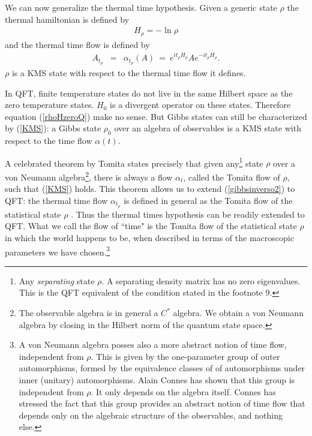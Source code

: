 \documentclass[10pt,nofootinbib]{revtex4}
\begin{document}
We can now generalize the thermal time hypothesis.  Given a generic
state $\rho$ the thermal hamiltonian is defined by
\begin{eqnarray}
H_{\rho} = -\ln \rho
\label{Htr}
\end{eqnarray}
and the thermal time flow is defined by 
\begin{eqnarray}
A_{t_{\rho}}& = & \alpha_{t_{\rho}}(A) \ =\ e^{it_{\rho} H_{\rho}}A
e^{-it_{\rho} H_{\rho}}.
\label{ABtQM} 
\end{eqnarray}
$\rho$ is a KMS state with respect to the thermal time flow  it defines.

In QFT, finite
temperature states do not live in the same Hilbert space as the zero
temperature states.  $H_{0}$ is a divergent operator on these states. 
Therefore equation (\ref{rhoHzeroQ}) make no sense.
But Gibbs states can still be characterized by (\ref{KMS}): a Gibbs state
$\rho_{0}$ over an algebra of observables is a KMS state with respect
to the time flow $\alpha(t)$.

A celebrated theorem by Tomita states precisely that
given any\footnote{Any \emph{separating} state $\rho$.  A separating
density matrix has no zero eigenvalues.  This is the QFT equivalent of
the condition stated in the footnote 9.} state $\rho$ over a von Neumann 
algebra\footnote{The
observable algebra is in general a $C^*$ algebra.  We obtain a von
Neumann algebra by closing in the Hilbert norm of the quantum state
space.}, there is always a flow $\alpha_{t}$, called the Tomita flow
of $\rho$, such that (\ref{KMS}) holds.
This theorem allows us to extend (\ref{gibbsinverso2}) to QFT: the
thermal time flow $\alpha_{t_{\rho}}$ is defined in general as the
Tomita flow of the statistical state $\rho$ \cite{ConnesRovelli,Diamonds}.
Thus the thermal times hypothesis can be readily extended to QFT. What
we call the flow of ``time" is the Tomita flow of the
statistical state $\rho$ in which the world happens to be, when
described in terms of the macroscopic parameters we have 
chosen.\footnote{A von Neumann algebra posses also a more
abstract notion of time flow, independent from $\rho$.  This is given
by the one-parameter group of outer automorphisms, formed by the
equivalence classes of of automorphisms under inner (unitary)
automorphisms.  Alain Connes has shown that this group
is independent from $\rho$.  It only depends on the algebra itself. 
Connes has stressed the fact that this group provides an abstract
notion of time flow that depends only on the algebraic structure of
the observables, and nothing else.}
\end{document}
